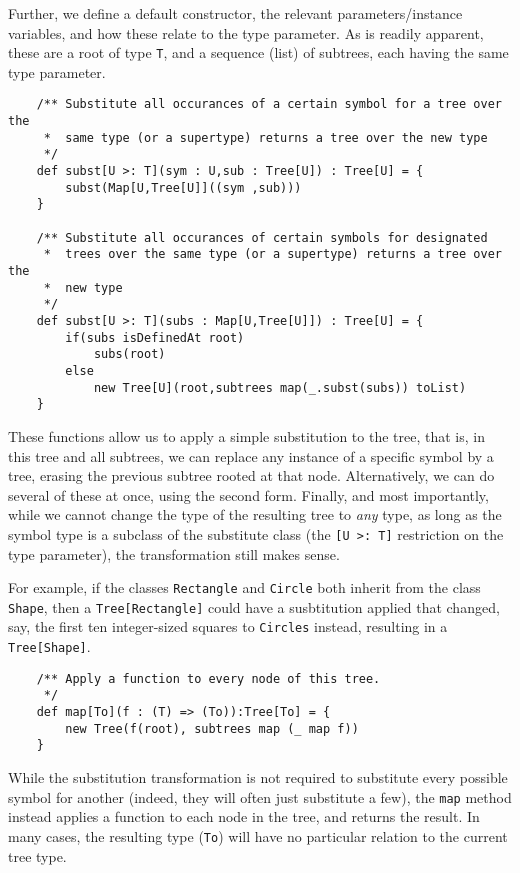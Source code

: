 Further, we define a default constructor, the relevant parameters/instance
variables, and how these relate to the type parameter. As is readily
apparent, these are a root of type \texttt{T}, and a sequence (list) of
subtrees, each having the same type parameter.

\begin{verbatim}
	/** Substitute all occurances of a certain symbol for a tree over the
	 *  same type (or a supertype) returns a tree over the new type
	 */
	def subst[U >: T](sym : U,sub : Tree[U]) : Tree[U] = {
		subst(Map[U,Tree[U]]((sym ,sub)))
	}

	/** Substitute all occurances of certain symbols for designated 
	 *  trees over the same type (or a supertype) returns a tree over the
	 *  new type
	 */
	def subst[U >: T](subs : Map[U,Tree[U]]) : Tree[U] = {
		if(subs isDefinedAt root)
			subs(root)
		else
			new Tree[U](root,subtrees map(_.subst(subs)) toList)
	}
\end{verbatim}


These functions allow us to apply a simple substitution to the tree, that
is, in this tree and all subtrees, we can replace any instance of a
specific symbol by a tree, erasing the previous subtree rooted at that
node. Alternatively, we can do several of these at once, using the second
form. Finally, and most importantly, while we cannot change the type of the
resulting tree to \emph{any} type, as long as the symbol type is a subclass
of the substitute class (the \texttt{[U >: T]} restriction on the type
parameter), the transformation still makes sense. 

For example, if the classes \texttt{Rectangle} and \texttt{Circle} both
inherit from the class \texttt{Shape}, then a \texttt{Tree[Rectangle]}
could have a susbtitution applied that changed, say, the first ten
integer-sized squares to \texttt{Circles} instead, resulting in a
\texttt{Tree[Shape]}.

\begin{verbatim}	
	/** Apply a function to every node of this tree.
	 */
	def map[To](f : (T) => (To)):Tree[To] = {
		new Tree(f(root), subtrees map (_ map f))
	}
\end{verbatim}

While the substitution transformation is not required to substitute every
possible symbol for another (indeed, they will often just substitute a
few), the \texttt{map} method instead applies a function to each node in
the tree, and returns the result. In many cases, the resulting type
(\texttt{To}) will have no particular relation to the current tree type.

